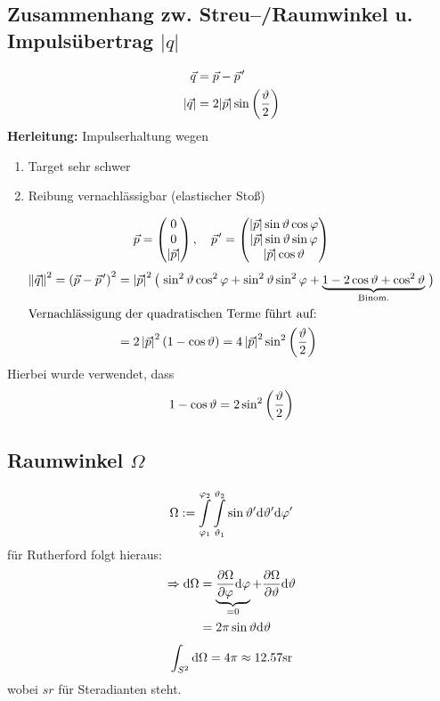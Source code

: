 \documentclass[Ex4_Zusammenfassung.tex]{subfiles}
\begin{document}
\subsection*{Zusammenhang zw. Streu--/Raumwinkel u. Impulsübertrag $|q|$}
\begin{align}
	\vec{q} &= \vec{p} - \pvec{p}^\prime \\
	|\vec{q}| &= 2 |\vec{p}| \sin \lp \frac{\vartheta}{2} \rp 
\end{align}
\newpage
\textbf{Herleitung:} Impulserhaltung wegen
\begin{enumerate}
	\item Target sehr schwer
	\item Reibung vernachlässigbar (elastischer Stoß)
\end{enumerate}
\begin{equation}
	\vec{p} = \threevec{0}{0}{|\vec{p}|}, \quad \pvec{p}^\prime = \threevec{|\vec{p}| \sin \vartheta \cos \varphi}{|\vec{p}| \sin \vartheta \sin \varphi}{|\vec{p}| \cos \vartheta}
\end{equation}
\begin{align}
	\left\Vert \vec{q} \right\Vert^2 = \lp \vec{p} - \pvec{p}^\prime \rp^2 &= \left\vert \vec{p} \right\vert^2
	\lp \vphantom{\sin^2 \vartheta \cos^2 \varphi + \sin^2 \vartheta \sin^2 \varphi } \right.
	\sin^2 \vartheta \cos^2 \varphi + \sin^2 \vartheta \sin^2 \varphi + \underbrace{1 - 2\cos \vartheta + \cos^2 \vartheta}_{\text{Binom.}} 
	\left. \vphantom{\sin^2 \vartheta \cos^2 \varphi + \sin^2 \vartheta \sin^2 \varphi} \rp\\
	\intertext{Vernachlässigung der quadratischen Terme führt auf:}
	&= 2 \left\vert \vec{p} \right\vert^2 \lp 1 - \cos \vartheta \rp = 4 \left\vert \vec{p} \right\vert^2 \sin^2 \lp \frac{\vartheta}{2} \rp
\end{align}
Hierbei wurde verwendet, dass
\begin{equation*}
	1 - \cos \vartheta = 2 \sin^2 \lp \frac{\vartheta}{2} \rp
\end{equation*}

\subsection*{Raumwinkel $\Omega$}
\begin{equation}
	\Omega := \mathop{\int}_{\varphi_1}^{\varphi_2} \mathop{\int}_{\vartheta_1}^{\vartheta_2} \sin \vartheta^\prime \md \vartheta^\prime \md \varphi^\prime
\end{equation}
für Rutherford folgt hieraus: 
\begin{align}
	\Rightarrow \md \Omega &= \underbrace{\frac{\partial \Omega}{\partial \varphi} \md \varphi}_{=0} + \frac{\partial \Omega}{\partial \vartheta} \md \vartheta\\
	&= 2 \pi \sin \vartheta \md \vartheta
\end{align}
\begin{equation}
	\int_{S^2} \md \Omega = 4\pi \approx 12.57\si{sr}
\end{equation}
wobei $\si{sr}$ für Steradianten steht.
\end{document}
